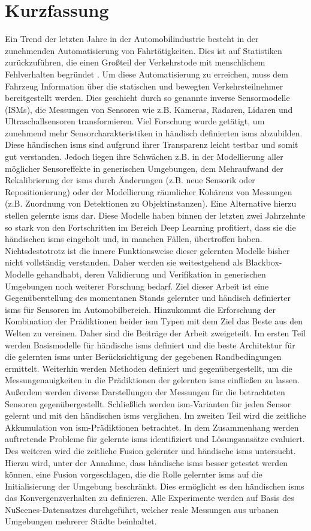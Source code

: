 {\section*{Kurzfassung}
Ein Trend der letzten Jahre in der Automobilindustrie besteht in der zunehmenden Automatisierung von Fahrtätigkeiten. Dies ist auf Statistiken zurückzuführen, die einen Gro{\ss}teil der Verkehrstode mit menschlichem Fehlverhalten begründet \cite{world2018global}. Um diese Automatisierung zu erreichen, muss dem Fahrzeug Information über die statischen und bewegten Verkehrsteilnehmer bereitgestellt werden. Dies geschieht durch so genannte inverse Sensormodelle (ISMs), die Messungen von Sensoren wie z.B. Kameras, Radaren, Lidaren und Ultraschallsensoren transformieren. Viel Forschung wurde getätigt, um zunehmend mehr Sensorcharakteristiken in händisch definierten \gls{ism}s abzubilden. Diese händischen \gls{ism}s sind aufgrund ihrer Transparenz leicht testbar und somit gut verstanden. Jedoch liegen ihre Schwächen z.B. in der Modellierung aller möglicher Sensoreffekte in generischen Umgebungen, dem Mehraufwand der Rekalibrierung der \gls{ism}s durch Änderungen (z.B. neue Sensorik oder Repositionierung) oder der Modellierung räumlicher Kohärenz von Messungen (z.B. Zuordnung von Detektionen zu Objektinstanzen). Eine Alternative hierzu stellen gelernte \gls{ism}s dar. Diese Modelle haben binnen der letzten zwei Jahrzehnte so stark von den Fortschritten im Bereich Deep Learning profitiert, dass sie die händischen \gls{ism}s eingeholt und, in manchen Fällen, übertroffen haben. Nichtsdestotrotz ist die innere Funktionsweise dieser gelernten Modelle bisher nicht vollständig verstanden. Daher werden sie weitestgehend als Blackbox-Modelle gehandhabt, deren Validierung und Verifikation in generischen Umgebungen noch weiterer Forschung bedarf. Ziel dieser Arbeit ist eine Gegenüberstellung des momentanen Stands gelernter und händisch definierter \gls{ism}s für Sensoren im Automobilbereich. Hinzukommt die Erforschung der Kombination der Prädiktionen beider \gls{ism} Typen mit dem Ziel das Beste aus den Welten zu vereinen. Daher sind die Beiträge der Arbeit zweigeteilt. Im ersten Teil werden Basismodelle für händische \gls{ism}s definiert und die beste Architektur für die gelernten \gls{ism}s unter Berücksichtigung der gegebenen Randbedingungen ermittelt. Weiterhin werden Methoden definiert und gegenübergestellt, um die Messungenauigkeiten in die Prädiktionen der gelernten \gls{ism}s einflie{\ss}en zu lassen. Au{\ss}erdem werden diverse Darstellungen der Messungen für die betrachteten Sensoren gegenübergestellt. Schlie{\ss}lich werden \gls{ism}-Varianten für jeden Sensor gelernt und mit den händischen \gls{ism}s verglichen. Im zweiten Teil wird die zeitliche Akkumulation von \gls{ism}-Prädiktionen betrachtet. In dem Zusammenhang werden auftretende Probleme für gelernte \gls{ism}s identifiziert und Lösungsansätze evaluiert. Des weiteren wird die zeitliche Fusion gelernter und händische \gls{ism}s untersucht. Hierzu wird, unter der Annahme, dass händische \gls{ism}s besser getestet werden können, eine Fusion vorgeschlagen, die die Rolle gelernter \gls{ism}s auf die Initialisierung der Umgebung beschränkt. Dies ermöglicht es den händischen \gls{ism}s das Konvergenzverhalten zu definieren. Alle Experimente werden auf Basis des NuScenes-Datensatzes \cite{caesar2020nuscenes} durchgeführt, welcher reale Messungen aus urbanen Umgebungen mehrerer Städte beinhaltet.
}
